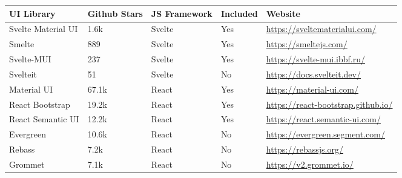 \begin{table*}[t]
	\begin{tabularx}{\textwidth}{l|l|l|l|X}
		\toprule
		\textbf{UI Library}     & \textbf{Github Stars}    & \textbf{JS Framework} & \textbf{Included} & \textbf{Website}                                                                 \\ \midrule
		Svelte Material UI      & 1.6k                     & Svelte                & Yes               & \url{https://sveltematerialui.com/}                                              \\ \hline
		Smelte                  & 889                      & Svelte                & Yes               & \url{https://smeltejs.com/}                                                      \\ \hline
		Svelte-MUI              & 237                      & Svelte                & Yes               & \url{https://svelte-mui.ibbf.ru/}                                                \\ \hline
		Svelteit                & 51                       & Svelte                & No                & \url{https://docs.svelteit.dev/}                                                 \\ \hline
		Material UI             & 67.1k                    & React                 & Yes               & \url{https://material-ui.com/}                                                   \\ \hline
		React Bootstrap         & 19.2k                    & React                 & Yes               & \url{https://react-bootstrap.github.io/}                                         \\ \hline
		React Semantic UI       & 12.2k                    & React                 & Yes               & \url{https://react.semantic-ui.com/}                                             \\ \hline
		Evergreen               & 10.6k                    & React                 & No                & \url{https://evergreen.segment.com/}                                             \\ \hline
		Rebass                  & 7.2k                     & React                 & No                & \url{https://rebassjs.org/}                                                      \\ \hline
		Grommet                 & 7.1k                     & React                 & No                & \url{https://v2.grommet.io/}                                                     \\ \hline

\end{tabularx}
\end{table*}
